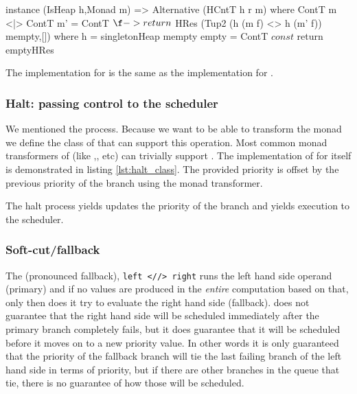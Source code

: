 \begin{code}
\begin{haskellcode}
instance (IsHeap h,Monad m) => Alternative (HCntT h r m) where
  ContT m <|> ContT m' = ContT $ \f -> return
    $ HRes (Tup2 (h (m f) <> h (m' f)) mempty,[])
    where
      h = singletonHeap mempty
  empty = ContT $ const $ return emptyHRes
\end{haskellcode}
  \caption{\label{lst:alternative_impl}The implementation for
     is the same as the implementation for
    .}
\end{code}


\subsubsection{Halt: passing control to the scheduler}

We mentioned the   process. Because we want to
be able to transform the  monad we define the class of
 that can support this operation. Most common monad
transformers of  (like ,, etc)
can trivially support . The implementation of 
for  itself is demonstrated in listing
\ref{lst:halt_class}. The provided priority is offset by the previous
priority of the branch using the  monad transformer.

\begin{code}
  \caption{\label{lst:halt_class}The halt process yields updates the
    priority of the branch and yields execution to the scheduler.}
\end{code}


\subsubsection{Soft-cut/fallback}

The \hask{<//>} (pronounced fallback), \texttt{left <//> right} runs
the left hand side operand (primary) and if no values are produced in
the \emph{entire} computation based on that, only then does it try to
evaluate the right hand side (fallback).  does not
guarantee that the right hand side will be scheduled immediately after
the primary branch completely fails, but it does guarantee that it
will be scheduled before it moves on to a new priority value. In other
words it is only guaranteed that the priority of the fallback branch
will tie the last failing branch of the left hand side in terms of
priority, but if there are other branches in the queue that tie, there
is no guarantee of how those will be scheduled.

